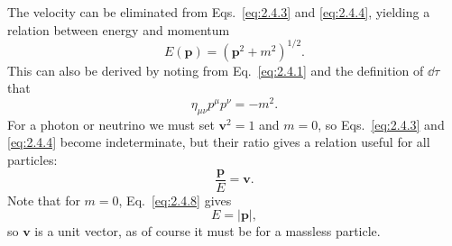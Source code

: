 The velocity can be eliminated from Eqs.~\eqref{eq:2.4.3} and
\eqref{eq:2.4.4}, yielding a relation between energy and momentum
\begin{equation}
  E(\mathbf p)=(\mathbf p^2+m^2)^{1/2}.
  \tag{2.4.8}\label{eq:2.4.8}
\end{equation}
This can also be derived by noting from Eq.~\eqref{eq:2.4.1} and the
definition of \(\dd\tau\) that
\begin{equation}
  \eta_{\mu\nu}p^\mu p^\nu=-m^2 .
  \tag{2.4.9}\label{eq:2.4.9}
\end{equation}
For a photon or neutrino we must set \(\mathbf v^2=1\) and \(m=0\), so
Eqs.~\eqref{eq:2.4.3} and \eqref{eq:2.4.4} become indeterminate, but their
ratio gives a relation useful for all particles:
\begin{equation}
  \frac{\mathbf p}{E}=\mathbf v .
  \tag{2.4.10}\label{eq:2.4.10}
\end{equation}
Note that for \(m=0\), Eq.~\eqref{eq:2.4.8} gives
\[
  E=\lvert\mathbf p\rvert ,
\]
so \(\mathbf v\) is a unit vector, as of course it must be for a massless
particle.
